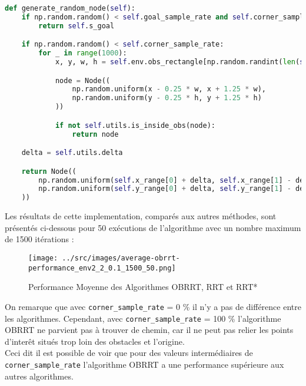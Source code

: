 \documentclass[../CSC_5RO16_TA_TP2.tex]{subfiles}
\begin{document}
\begin{scriptsize}\mycode
	\begin{lstlisting}[language=python]
def generate_random_node(self):
    if np.random.random() < self.goal_sample_rate and self.corner_sample_rate < 1 - self.goal_sample_rate:
        return self.s_goal

    if np.random.random() < self.corner_sample_rate:
        for _ in range(1000):
            x, y, w, h = self.env.obs_rectangle[np.random.randint(len(self.env.obs_rectangle))]

            node = Node((
                np.random.uniform(x - 0.25 * w, x + 1.25 * w),
                np.random.uniform(y - 0.25 * h, y + 1.25 * h)
            ))

            if not self.utils.is_inside_obs(node):
                return node

    delta = self.utils.delta

    return Node((
        np.random.uniform(self.x_range[0] + delta, self.x_range[1] - delta),
        np.random.uniform(self.y_range[0] + delta, self.y_range[1] - delta)
    ))
	\end{lstlisting}
\end{scriptsize}
\noindent Les résultats de cette implementation, comparés aux autres méthodes, sont présentés ci-dessous pour 50 exécutions de l'algorithme avec un nombre maximum de 1500 itérations :
\begin{figure}[H]
    \centering
	\texttt{[image: ../src/images/average-obrrt-performance\_env2\_2\_0.1\_1500\_50.png]}
	\caption{Performance Moyenne des Algorithmes \textcolor{graph_green}{OBRRT}, \textcolor{graph_blue}{RRT} et \textcolor{graph_orange}{RRT*}}
	\label{}
\end{figure}
\noindent On remarque que avec \texttt{corner\_sample\_rate} = 0 \% il n'y a pas de différence entre les algorithmes. Cependant, avec \texttt{corner\_sample\_rate} = 100 \% l'algorithme \textcolor{graph_green}{OBRRT} ne parvient pas à trouver de chemin, car il ne peut pas relier les points d'interêt situés trop loin des obstacles et l'origine.\\

\noindent Ceci dit il est possible de voir que pour des valeurs intermédiaires de \texttt{corner\_sample\_rate} l'algorithme \textcolor{graph_green}{OBRRT} a une performance supérieure aux autres algorithmes.\\
\end{document}
